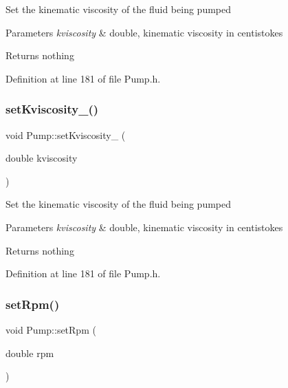 Set the kinematic viscosity of the fluid being pumped


\begin{DoxyParams}{Parameters}
{\em kviscosity} & double, kinematic viscosity in centistokes\\
\hline
\end{DoxyParams}
\begin{DoxyReturn}{Returns}
nothing 
\end{DoxyReturn}


Definition at line 181 of file Pump.\+h.

\mbox{\label{class_pump_a26d1d10908f91137f5148540ceb6520a}} 
\subsubsection{\texorpdfstring{set\+Kviscosity\+\_\+()}{setKviscosity\_()}\hspace{0.1cm}{\footnotesize\ttfamily [3/3]}}
{\footnotesize\ttfamily void Pump\+::set\+Kviscosity\+\_\+ (\begin{DoxyParamCaption}\item[{double}]{kviscosity }\end{DoxyParamCaption})\hspace{0.3cm}{\ttfamily [inline]}}

Set the kinematic viscosity of the fluid being pumped


\begin{DoxyParams}{Parameters}
{\em kviscosity} & double, kinematic viscosity in centistokes\\
\hline
\end{DoxyParams}
\begin{DoxyReturn}{Returns}
nothing 
\end{DoxyReturn}


Definition at line 181 of file Pump.\+h.

\mbox{\label{class_pump_a7478d85c3b89cda275b039673603a785}} 
\subsubsection{\texorpdfstring{set\+Rpm()}{setRpm()}\hspace{0.1cm}{\footnotesize\ttfamily [1/3]}}
{\footnotesize\ttfamily void Pump\+::set\+Rpm (\begin{DoxyParamCaption}\item[{double}]{rpm }\end{DoxyParamCaption})\hspace{0.3cm}{\ttfamily [inline]}}

